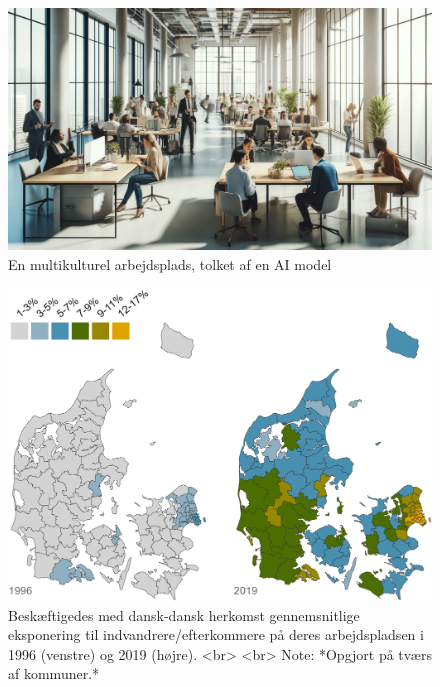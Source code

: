 \documentclass[
]{book}
\begin{document}
\begin{figure}
\includegraphics[width=1\linewidth]{images/dalle-work} \caption{En multikulturel arbejdsplads, tolket af en AI model}\label{fig:fig-work}
\end{figure}

\begin{figure}
\includegraphics[width=1\linewidth]{images/Figur_4_1} \caption{Beskæftigedes med dansk-dansk herkomst gennemsnitlige eksponering til indvandrere/efterkommere på deres arbejdspladsen i 1996 (venstre) og 2019 (højre). <br> <br> Note: *Opgjort på tværs af kommuner.*}\label{fig:fig-4-1}
\end{figure}
\end{document}
